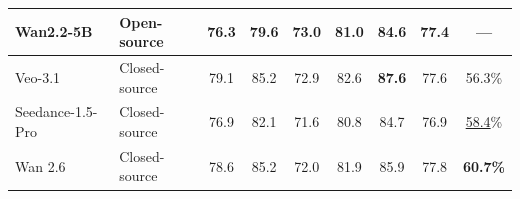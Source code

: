 \begin{table}[t]
\begin{tabular}{l l | ccc | ccc | c}
        Wan2.2-5B                     & Open-source & 76.3 & 79.6 & 73.0 & 81.0 & 84.6 & 77.4 & ---  \\
        \midrule
        Veo-3.1                       & Closed-source   & 79.1 & 85.2 & 72.9 & 82.6 & \textbf{87.6} & 77.6 & 56.3\% \\
        Seedance-1.5-Pro              & Closed-source   & 76.9 & 82.1 & 71.6 & 80.8  & 84.7  & 76.9  & \underline{58.4}\% \\
        Wan 2.6                       & Closed-source & 78.6 & 85.2 & 72.0 & 81.9 & 85.9 & 77.8  & \textbf{60.7\%}\\
        \bottomrule
    \end{tabular}
    \vspace{-0.5\baselineskip}
\end{table}
